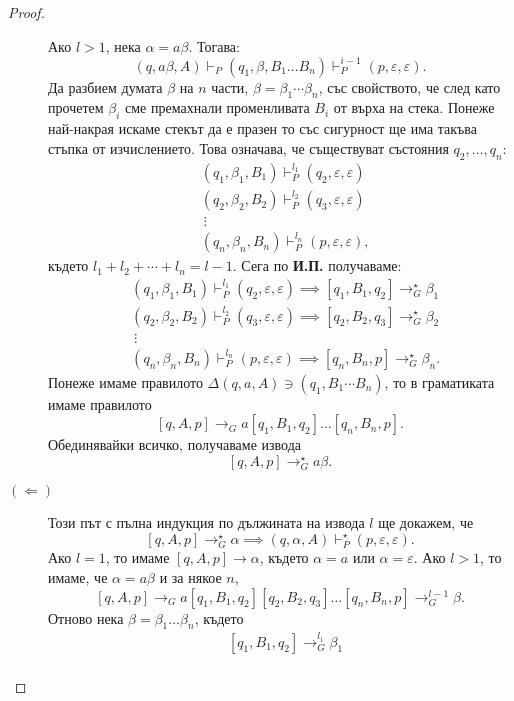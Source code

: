 \begin{proof}
\begin{description}
    Ако $l > 1$, нека $\alpha = a\beta$. Тогава:
    \[(q,a\beta,A) \vdash_P (q_1,\beta,B_1\dots B_n) \vdash^{i-1}_P (p, \varepsilon, \varepsilon).\]
    Да разбием думата $\beta$ на $n$ части, $\beta = \beta_1\cdots \beta_n$, със свойството, че след като прочетем $\beta_i$ 
    сме премахнали променливата $B_i$ от върха на стека.
    Понеже най-накрая искаме стекът да е празен то със сигурност ще има такъва стъпка от изчислението.
    Това означава, че съществуват състояния $q_2,\dots,q_{n}$:
    \begin{align*}
      & (q_1, \beta_1, B_1) \vdash^{l_1}_P (q_{2},\varepsilon,\varepsilon)\\
      & (q_2, \beta_2, B_2) \vdash^{l_2}_P (q_{3},\varepsilon,\varepsilon)\\
      & \ \vdots\\
      & (q_n, \beta_n, B_n) \vdash^{l_n}_P (p,\varepsilon,\varepsilon),
    \end{align*}
    където $l_1+l_2+\cdots+l_n = l-1$.
    Сега по {\bf И.П.} получаваме:
    \begin{align*}
      & (q_1, \beta_1, B_1) \vdash^{l_1}_P (q_{2},\varepsilon,\varepsilon) \implies [q_1,B_1, q_{2}] \to^\star_G \beta_1\\
      & (q_2, \beta_2, B_2) \vdash^{l_2}_P (q_{3},\varepsilon,\varepsilon) \implies [q_2,B_2, q_{3}] \to^\star_G \beta_2\\
      & \ \vdots\\
      & (q_n, \beta_n, B_n) \vdash^{l_n}_P (p,\varepsilon,\varepsilon) \implies [q_n,B_n, p] \to^\star_G \beta_n.
    \end{align*}
    Понеже имаме правилото $\Delta(q,a,A) \ni (q_1,B_1\cdots B_n)$, то в граматиката имаме правилото
    \[[q,A,p] \rightarrow_G a[q_1,B_1,q_2]\dots[q_n,B_n,p].\]
    Обединявайки всичко, получаваме извода
    \[[q,A,p] \rightarrow^\star_G a\beta.\]
  \item[$(\Leftarrow)$]
    Този път с пълна индукция по дължината на извода $l$ ще докажем, че
    \[[q,A,p] \rightarrow^\star_G \alpha \implies (q,\alpha,A) \vdash^\star_P (p,\varepsilon,\varepsilon).\]
    Ако $l = 1$, то имаме $[q,A,p] \rightarrow \alpha$, където $\alpha = a$ или $\alpha = \varepsilon$.
    Ако $l > 1$, то имаме, че $\alpha = a\beta$ и за някое $n$, 
    \[[q,A,p] \rightarrow_G a[q_1,B_1,q_2][q_2,B_2,q_3]\dots[q_n,B_n,p] \rightarrow^{l-1}_G \beta.\]
    Отново нека $\beta = \beta_1\dots \beta_n$, където 
    \begin{align*}
      & [q_1,B_1,q_{2}] \to^{l_1}_G \beta_1\\

\end{align*}
\end{description}
\end{proof}

